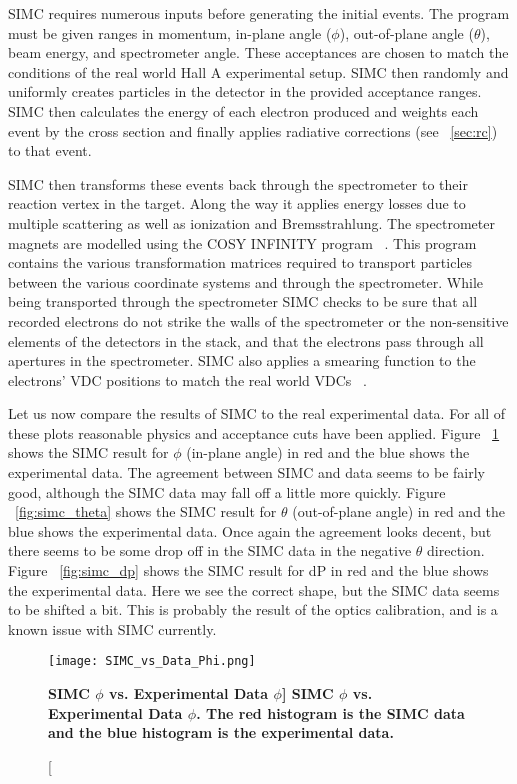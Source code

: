 SIMC requires numerous inputs before generating the initial events. The program must be given ranges in momentum, in-plane angle ($\phi$), out-of-plane angle ($\theta$), beam energy, and spectrometer angle. These acceptances are chosen to match the conditions of the real world Hall A experimental setup. SIMC then randomly and uniformly creates particles in the detector in the provided acceptance ranges. SIMC then calculates the energy of each electron produced and weights each event by the cross section and finally applies radiative corrections (see ~\ref{sec:rc}) to that event. 

SIMC then transforms these events back through the spectrometer to their reaction vertex in the target. Along the way it applies energy losses due to multiple scattering as well as ionization and Bremsstrahlung. The spectrometer magnets are modelled using the COSY INFINITY program ~\cite{cosy}. This program contains the various transformation matrices required to transport particles between the various coordinate systems and through the spectrometer. While being transported through the spectrometer SIMC checks to be sure that all recorded electrons do not strike the walls of the spectrometer or the non-sensitive elements of the detectors in the stack, and that the electrons pass through all apertures in the spectrometer. SIMC also applies a smearing function to the electrons' VDC positions to match the real world VDCs ~\cite{Thesis:Wang}. 

Let us now compare the results of SIMC to the real experimental data. For all of these plots reasonable physics and acceptance cuts have been applied. Figure ~\ref{fig:simc_phi} shows the SIMC result for $\phi$ (in-plane angle) in red and the blue shows the experimental data. The agreement between SIMC and data seems to be fairly good, although the SIMC data may fall off a little more quickly. Figure ~\ref{fig:simc_theta} shows the SIMC result for $\theta$ (out-of-plane angle) in red and the blue shows the experimental data. Once again the agreement looks decent, but there seems to be some drop off in the SIMC data in the negative $\theta$ direction.  Figure ~\ref{fig:simc_dp} shows the SIMC result for dP in red and the blue shows the experimental data. Here we see the correct shape, but the SIMC data seems to be shifted a bit. This is probably the result of the optics calibration, and is a known issue with SIMC currently.

\begin{figure}[!ht]
\begin{center}
\texttt{[image: SIMC\_vs\_Data\_Phi.png]}
\end{center}
\caption[\bf{SIMC $\phi$ vs. Experimental Data $\phi$}]{
{\bf{SIMC $\phi$ vs. Experimental Data $\phi$.}} The red histogram is the SIMC data and the blue histogram is the experimental data.}
\label{fig:simc_phi}
\end{figure}


